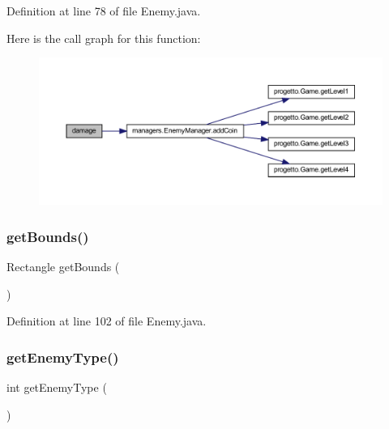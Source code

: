 Definition at line 78 of file Enemy.\+java.

Here is the call graph for this function\+:\nopagebreak
\begin{figure}[H]
\begin{center}
\leavevmode
\includegraphics[width=350pt]{classenemies_1_1_enemy_ab316db3306dfd12457e3df71e933ca2d_cgraph}
\end{center}
\end{figure}
\mbox{\label{classenemies_1_1_enemy_a187945475e730bfa340a10f63224e91f}} 
\subsubsection{\texorpdfstring{get\+Bounds()}{getBounds()}}
{\footnotesize\ttfamily Rectangle get\+Bounds (\begin{DoxyParamCaption}{ }\end{DoxyParamCaption})}



Definition at line 102 of file Enemy.\+java.

\mbox{\label{classenemies_1_1_enemy_a40aced6dca930a3ae575a42b3286e230}} 
\subsubsection{\texorpdfstring{get\+Enemy\+Type()}{getEnemyType()}}
{\footnotesize\ttfamily int get\+Enemy\+Type (\begin{DoxyParamCaption}{ }\end{DoxyParamCaption})}



